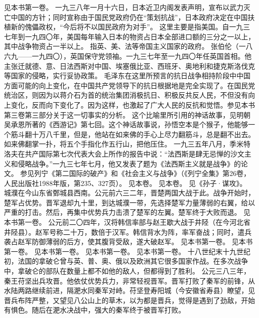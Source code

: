 \begin{maonote}
见本书第一卷。
一九三八年一月十六日，日本近卫内阁发表声明，宣布以武力灭亡中国的方针；同时宣称由于国民党政府仍在“策划抗战”，日本政府决定在中国扶植新的傀儡政权，“今后将不以国民政府为对手”。
这里主要是指美国。自一九三七年到一九四〇年，美国每年输入日本的物资占日本全部进口额的三分之一以上，其中战争物资占一半以上。
指英、美、法等帝国主义国家的政府。
张伯伦（一八六九——一九四〇），英国保守党领袖。一九三七年至一九四〇年任英国首相。他主张迁就德、意、日法西斯对中国、埃塞俄比亚、西班牙、奥地利和捷克斯洛伐克等国家的侵略，实行妥协政策。
毛泽东在这里所预言的抗日战争相持阶段中中国方面可能的向上变化，在中国共产党领导下的抗日根据地是完全实现了。在国民党统治区，则因为以蒋介石为首的统治集团消极抗日、积极反共反人民，不但没有向上变化，反而向下变化了。因为这样，也激起了广大人民的反抗和觉悟。参见本书第三卷第三部分关于这一切事实的分析。
这个比喻里所引用的神话故事，见明朝吴承恩所著的《西游记》第七回。这个神话故事说，孙悟空本是个猴子，他能够一个筋斗翻十万八千里，但是，他站在如来佛的手心上尽力翻筋斗，总是翻不出去。如来佛翻掌一扑，将五个手指化作五行山，把他压住。
一九三五年八月，季米特洛夫在共产国际第七次代表大会上所作的报告中说：“法西斯是肆无忌惮的沙文主义和侵略战争。”一九三七年七月，他又发表了题为《法西斯主义就是战争》的论文。
参见列宁《第二国际的破产》和《社会主义与战争》（《列宁全集》第26卷，人民出版社1988年版，第235、327页）。
见本卷。
见本卷。
见《孙子·谋攻》。
城濮在今山东省鄄城县西南。公元前六三二年，晋楚两国大战于此。战争开始时，楚军占优势。晋军退却九十里，到达城濮一带，先选择楚军力量薄弱的右翼，给以严重的打击。然后，再集中优势兵力击溃了楚军的左翼。楚军终于大败而退。
见本书第一卷。
公元前二〇四年，汉将韩信率部与赵王歇大战于井陉（在今河北省井陉县）。赵军号称二十万，数倍于汉军。韩信背水为阵，率军奋战；同时，遣兵袭占赵军防御薄弱的后方，使其腹背受敌，遂大破赵军。
见本书第一卷。
见本书第一卷。
见本书第一卷。
见本书第一卷。
见本书第一卷。
十八世纪末十九世纪初，法国的拿破仑曾与英、普、奥、俄以及欧洲其它很多国家作战。在多次战争中，拿破仑的部队在数量上都不如他的敌人，但都得到了胜利。
公元三八三年，秦王苻坚出兵攻晋。他依仗优势兵力，非常轻视晋军。晋军打败了秦军的前锋，从水陆两路继续前进，隔淝水同秦军对峙。苻坚登寿阳城（今安徽省寿县）瞭望，见晋兵布阵严整，又望见八公山上的草木，以为都是晋兵，觉得是遇到了劲敌，开始有惧色。随后在淝水决战中，强大的秦军终于被晋军打败。

\end{maonote}
